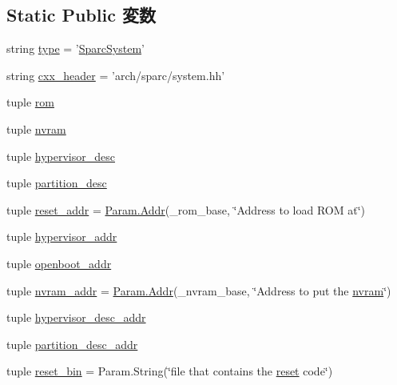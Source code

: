 \subsection*{Static Public 変数}
\begin{DoxyCompactItemize}
\item 
string \hyperlink{classSparcSystem_1_1SparcSystem_acce15679d830831b0bbe8ebc2a60b2ca}{type} = '\hyperlink{classSparcSystem_1_1SparcSystem}{SparcSystem}'
\item 
string \hyperlink{classSparcSystem_1_1SparcSystem_a17da7064bc5c518791f0c891eff05fda}{cxx\_\-header} = 'arch/sparc/system.hh'
\item 
tuple \hyperlink{classSparcSystem_1_1SparcSystem_a5fef0da57edbb35c242e2e5bc1a1235d}{rom}
\item 
tuple \hyperlink{classSparcSystem_1_1SparcSystem_a4e6636544da22895e90d5de8d019d349}{nvram}
\item 
tuple \hyperlink{classSparcSystem_1_1SparcSystem_a87ab875c63de4f4118f5e123be062cd2}{hypervisor\_\-desc}
\item 
tuple \hyperlink{classSparcSystem_1_1SparcSystem_ac24f22805b57eeafeae771d3279fbda0}{partition\_\-desc}
\item 
tuple \hyperlink{classSparcSystem_1_1SparcSystem_a3a41be5b1b3269a37a1ec40044187614}{reset\_\-addr} = \hyperlink{base_2types_8hh_af1bb03d6a4ee096394a6749f0a169232}{Param.Addr}(\_\-rom\_\-base, \char`\"{}Address to load ROM at\char`\"{})
\item 
tuple \hyperlink{classSparcSystem_1_1SparcSystem_ab5969daf7ba890fbaab05aaa9f30d5b5}{hypervisor\_\-addr}
\item 
tuple \hyperlink{classSparcSystem_1_1SparcSystem_af9c20be318035d57c166c80966c9e8ef}{openboot\_\-addr}
\item 
tuple \hyperlink{classSparcSystem_1_1SparcSystem_aaef9d4cdf47e941ffd2f34e78bbc7532}{nvram\_\-addr} = \hyperlink{base_2types_8hh_af1bb03d6a4ee096394a6749f0a169232}{Param.Addr}(\_\-nvram\_\-base, \char`\"{}Address to put the \hyperlink{classSparcSystem_a2e5918976373473601e9423650ed3df9}{nvram}\char`\"{})
\item 
tuple \hyperlink{classSparcSystem_1_1SparcSystem_abf580feb0b7f92c3c748176835bc0626}{hypervisor\_\-desc\_\-addr}
\item 
tuple \hyperlink{classSparcSystem_1_1SparcSystem_aeb41644b2431d61ef3d16521627a7bf7}{partition\_\-desc\_\-addr}
\item 
tuple \hyperlink{classSparcSystem_1_1SparcSystem_a103bf48ad3f4f84eca7df4e8dd88377b}{reset\_\-bin} = Param.String(\char`\"{}file that contains the \hyperlink{classSparcSystem_abd507156b4f29b64ca6c1327e3c9aff1}{reset} code\char`\"{})

\end{DoxyCompactItemize}
